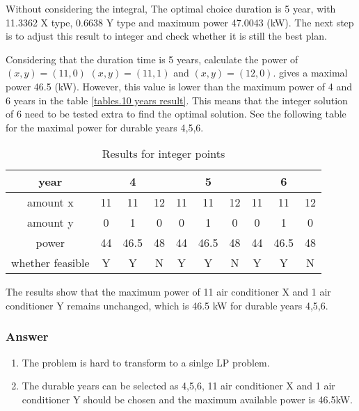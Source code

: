 \documentclass[titlepage,a4paper]{article}
\begin{document}
        Without considering the integral, The optimal choice duration is 5 year, with 11.3362 X type, 0.6638 Y type and maximum power 47.0043 (kW). The next step is to adjust this result to integer and check whether it is still the best plan.

        Considering that the duration time is 5 years, calculate the power of $(x,y)=(11,0)$  $(x,y)=(11,1)$ and $(x,y)=(12,0)$. gives a maximal power 46.5 (kW). However, this value is lower than the maximum power of 4 and 6 years in the table \ref{tables.10 years result}. This means that the integer solution of 6 need to be tested extra to find the optimal solution. See the following table for the maximal power for durable years 4,5,6. 

        \begin{table}[H]
            \centering
        
            \begin{tabular}{c|ccc|ccc|ccc}
                \hline
                year  & \multicolumn{3}{c|}{4} & \multicolumn{3}{c|}{5} & \multicolumn{3}{c|}{6} \\ \hline
                amount x    & 11    & 11   & 12  & 11     & 11   & 12     & 11     & 11   & 12     \\
                amount y    & 0      & 1    & 0    & 0      & 1    & 0      & 0      & 1    & 0    \\
                power    & 44   & 46.5   & 48 & 44   & 46.5   & 48   & 44   & 46.5   & 48    \\ \hline
                whether feasible  & Y   & Y    & N & Y   & Y    & N      & Y      & Y    & N    \\ \hline
            \end{tabular}

            \caption{Results for integer points}

        \end{table}

        The results show that the maximum power of 11 air conditioner X and 1 air conditioner Y remains unchanged, which is 46.5 kW for durable years 4,5,6.        

        \subsubsection{Answer}
        \begin{enumerate}
            \item The problem is hard to transform to a sinlge LP problem.
            \item The durable years can be selected as 4,5,6, 11 air conditioner X and 1 air conditioner Y should be chosen and the maximum available power is 46.5kW.
        \end{enumerate}
                
        
\ifx \allfiles \undefined    
\end{document}
